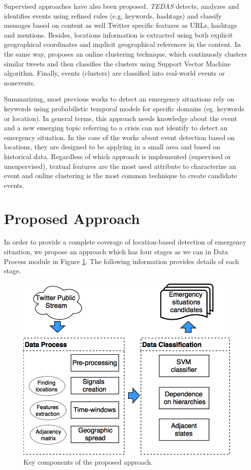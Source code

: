 \documentclass[sigconf]{acmart}
\begin{document}
Supervised approaches have also been proposed. \textit{TEDAS} \cite{li2012tedas} detects, analyzes and identifies events using refined rules (e.g, keywords, hashtags) and classify messages based on content as well Twitter specific features as URLs, hashtags and mentions. Besides, locations information is extracted using both explicit geographical coordinates and implicit geographical references in the content. In the same way, \cite{becker2011beyond} proposes an online clustering technique, which continuosly clusters similar tweets and then classifies the clusters using Support Vector Machine algorithm. Finally, events (clusters) are classified into real-world events or nonevents.

Summarizing, most previous works to detect an emergency situations rely on keywords using probabilistic temporal models for specific domains (eg. keywords or location). In general terms, this approach needs knowledge about the event and a new emerging topic referring to a crisis can not identify to detect an emergency situation. In the case of the works about event detection based on locations, they are designed to be applying in a small area and based on historical data. Regardless of which approach is implemented (supervised or unsupervised), textual features are the most used attribute to characterize an event and online clustering is the most common technique to create candidate events.


\section{Proposed Approach}

In order to provide a complete coverage of location-based detection of emergency situation, we propose an approach which has four stages as we can in Data Process module in Figure \ref{fig:diagram}. The following information provides details of each stage.

\begin{figure}
	\centering
	\includegraphics[width=\columnwidth]{img/diagram2.png}
	\caption{Key components of the proposed approach.}
	\label{fig:diagram}
\end{figure}
\end{document}
